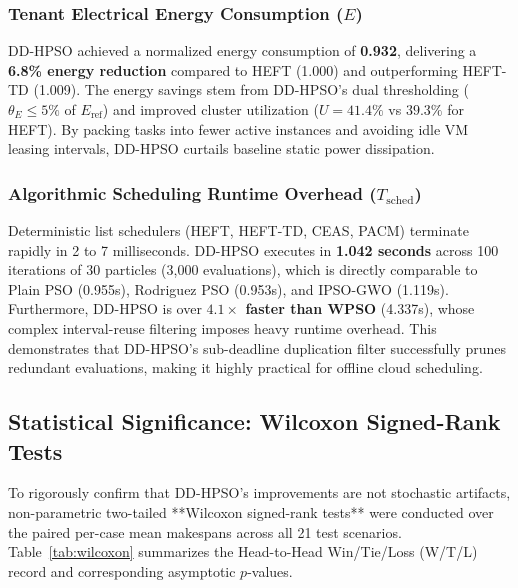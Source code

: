 \documentclass[journal]{IEEEtran}
\begin{document}
\subsubsection{Tenant Electrical Energy Consumption ($E$)}
DD-HPSO achieved a normalized energy consumption of \textbf{0.932}, delivering a \textbf{6.8\% energy reduction} compared to HEFT (1.000) and outperforming HEFT-TD (1.009). The energy savings stem from DD-HPSO's dual thresholding ($\theta_E \le 5\%$ of $E_{\text{ref}}$) and improved cluster utilization ($U = 41.4\%$ vs $39.3\%$ for HEFT). By packing tasks into fewer active instances and avoiding idle VM leasing intervals, DD-HPSO curtails baseline static power dissipation.

\subsubsection{Algorithmic Scheduling Runtime Overhead ($T_{\text{sched}}$)}
Deterministic list schedulers (HEFT, HEFT-TD, CEAS, PACM) terminate rapidly in 2 to 7 milliseconds. DD-HPSO executes in \textbf{1.042 seconds} across 100 iterations of 30 particles (3,000 evaluations), which is directly comparable to Plain PSO (0.955s), Rodriguez PSO (0.953s), and IPSO-GWO (1.119s). Furthermore, DD-HPSO is over \textbf{$4.1\times$ faster than WPSO} (4.337s), whose complex interval-reuse filtering imposes heavy runtime overhead. This demonstrates that DD-HPSO's sub-deadline duplication filter successfully prunes redundant evaluations, making it highly practical for offline cloud scheduling.

\subsection{Statistical Significance: Wilcoxon Signed-Rank Tests}
To rigorously confirm that DD-HPSO's improvements are not stochastic artifacts, non-parametric two-tailed **Wilcoxon signed-rank tests** were conducted over the paired per-case mean makespans across all 21 test scenarios. Table~\ref{tab:wilcoxon} summarizes the Head-to-Head Win/Tie/Loss (W/T/L) record and corresponding asymptotic $p$-values.
\end{document}
